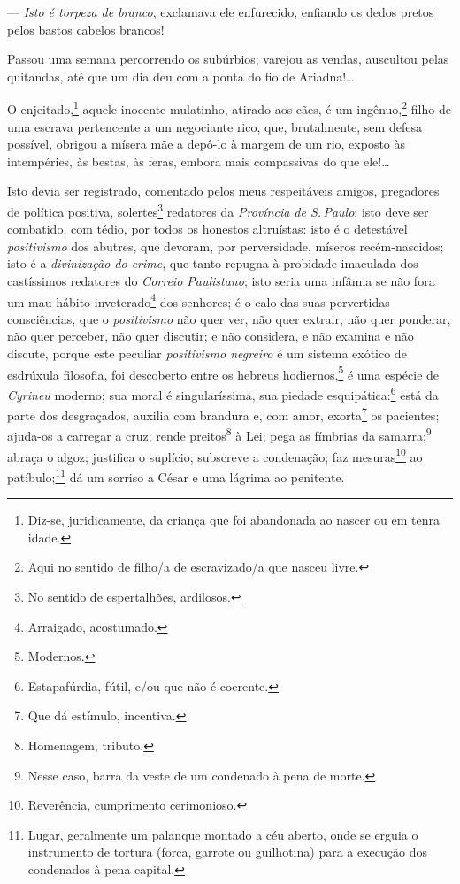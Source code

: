 --- \emph{Isto é torpeza de branco}, exclamava ele enfurecido, enfiando
os dedos pretos pelos bastos cabelos brancos!

Passou uma semana percorrendo os subúrbios; varejou as vendas, auscultou
pelas quitandas, até que um dia deu com a ponta do fio de Ariadna!\ldots{}

O enjeitado,\footnote{Diz-se, juridicamente, da criança que foi
  abandonada ao nascer ou em tenra idade.} aquele inocente mulatinho,
atirado aos cães, é um ingênuo,\footnote{Aqui no sentido de filho/a de
  escravizado/a que nasceu livre.} filho de uma escrava pertencente a
um negociante rico, que, brutalmente, sem defesa possível, obrigou a
mísera mãe a depô-lo à margem de um rio, exposto às intempéries, às
bestas, às feras, embora mais compassivas do que ele!\ldots{}

Isto devia ser registrado, comentado pelos meus respeitáveis amigos,
pregadores de política positiva, solertes\footnote{No sentido de
  espertalhões, ardilosos.} redatores da \emph{Província de S.\,Paulo};
isto deve ser combatido, com tédio, por todos os honestos altruístas:
isto é o detestável \emph{positivismo} dos abutres, que devoram, por
perversidade, míseros recém-nascidos; isto é a \emph{divinização do
crime}, que tanto repugna à probidade imaculada dos castíssimos
redatores do \emph{Correio Paulistano}; isto seria uma infâmia se não
fora um mau hábito inveterado\footnote{Arraigado, acostumado.} dos
senhores; é o calo das suas pervertidas consciências, que o
\emph{positivismo} não quer ver, não quer extrair, não quer ponderar,
não quer perceber, não quer discutir; e não considera, e não examina e
não discute, porque este peculiar \emph{positivismo negreiro} é um
sistema exótico de esdrúxula filosofia, foi descoberto entre os hebreus
hodiernos,\footnote{Modernos.} é uma espécie de \emph{Cyrineu} 
moderno; sua moral é singularíssima, sua piedade esquipática:\footnote{
  Estapafúrdia, fútil, e/ou que não é coerente.} está da parte dos
desgraçados, auxilia com brandura e, com amor, exorta\footnote{Que dá
  estímulo, incentiva.} os pacientes; ajuda-os a carregar a cruz; rende
preitos\footnote{Homenagem, tributo.} à Lei; pega as fímbrias da
samarra;\footnote{Nesse caso, barra da veste de um condenado à pena de
  morte.} abraça o algoz; justifica o suplício; subscreve a condenação;
faz mesuras\footnote{Reverência, cumprimento cerimonioso.} ao
patíbulo;\footnote{Lugar, geralmente um palanque montado a céu aberto,
  onde se erguia o instrumento de tortura (forca, garrote ou guilhotina)
  para a execução dos condenados à pena capital.}
dá um sorriso a César e uma
lágrima ao penitente.

